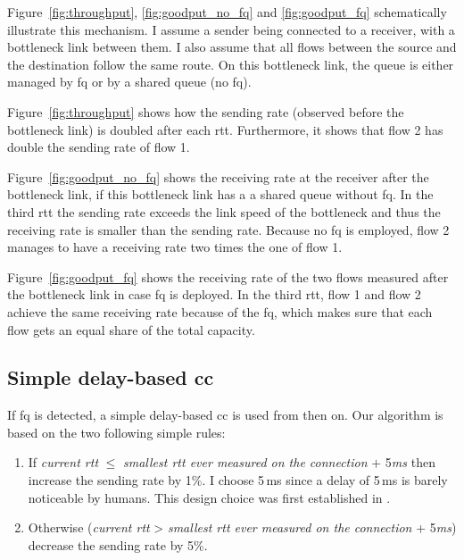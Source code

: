 \documentclass[conference]{IEEEtran}
\begin{document}
Figure~\ref{fig:throughput}, \ref{fig:goodput_no_fq} and \ref{fig:goodput_fq} schematically illustrate this mechanism. I assume a sender being connected to a receiver, with a bottleneck link between them. I also assume that all flows between the source and the destination follow the same route. On this bottleneck link, the queue is either managed by \gls{fq} or by a shared queue (no \gls{fq}). 

Figure~\ref{fig:throughput} shows how the sending rate (observed before the bottleneck link) is doubled after each \gls{rtt}. Furthermore, it shows that flow 2 has double the sending rate of flow 1. 

Figure~\ref{fig:goodput_no_fq} shows the receiving rate at the receiver after the bottleneck link, if this bottleneck link has a a shared queue without \gls{fq}. In the third \gls{rtt} the sending rate exceeds the link speed of the bottleneck and thus the receiving rate is smaller than the sending rate. Because no \gls{fq} is employed, flow 2 manages to have a receiving rate two times the one of flow 1. 

Figure~\ref{fig:goodput_fq} shows the receiving rate of the two flows measured after the bottleneck link in case \gls{fq} is deployed. In the third \gls{rtt}, flow 1 and flow 2 achieve the same receiving rate because of the \gls{fq}, which makes sure that each flow gets an equal share of the total capacity. 

\subsection{Simple delay-based \gls{cc}}

If \gls{fq} is detected, a simple delay-based \gls{cc} is used from then on. Our algorithm is based on the two following simple rules:
\begin{enumerate}
\item If \textit{current rtt} $\leq$ \textit{smallest rtt ever measured on the connection} $+$ 5\textit{ms} then increase the sending rate by 1\%. I choose 5\,ms since a delay of 5\,ms is barely noticeable by humans. This design choice was first established in \citep{nichols_controlling_2012}.
\item Otherwise (\textit{current rtt} > \textit{smallest rtt ever measured on the connection} + 5\textit{ms}) decrease the sending rate by 5\%.
\end{enumerate}

\end{document}
